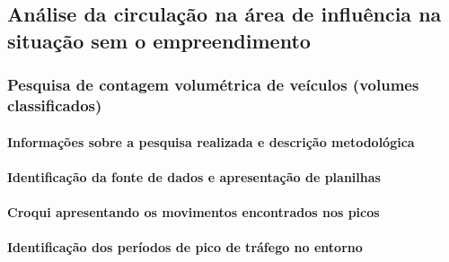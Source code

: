 \documentclass[]{article}
\let\oldparagraph\paragraph
\renewcommand{\paragraph}[1]{\oldparagraph{#1}\mbox{}}
\begin{document}
\hypertarget{anuxe1lise-da-circulauxe7uxe3o-na-uxe1rea-de-influuxeancia-na-situauxe7uxe3o-sem-o-empreendimento}{%
\subsection{Análise da circulação na área de influência na situação sem
o
empreendimento}\label{anuxe1lise-da-circulauxe7uxe3o-na-uxe1rea-de-influuxeancia-na-situauxe7uxe3o-sem-o-empreendimento}}

\hypertarget{pesquisa-de-contagem-volumuxe9trica-de-veuxedculos-volumes-classificados}{%
\subsubsection{Pesquisa de contagem volumétrica de veículos (volumes
classificados)}\label{pesquisa-de-contagem-volumuxe9trica-de-veuxedculos-volumes-classificados}}

\hypertarget{informauxe7uxf5es-sobre-a-pesquisa-realizada-e-descriuxe7uxe3o-metodoluxf3gica}{%
\paragraph{Informações sobre a pesquisa realizada e descrição
metodológica}\label{informauxe7uxf5es-sobre-a-pesquisa-realizada-e-descriuxe7uxe3o-metodoluxf3gica}}

\hypertarget{identificauxe7uxe3o-da-fonte-de-dados-e-apresentauxe7uxe3o-de-planilhas}{%
\paragraph{Identificação da fonte de dados e apresentação de
planilhas}\label{identificauxe7uxe3o-da-fonte-de-dados-e-apresentauxe7uxe3o-de-planilhas}}

\hypertarget{croqui-apresentando-os-movimentos-encontrados-nos-picos}{%
\paragraph{Croqui apresentando os movimentos encontrados nos
picos}\label{croqui-apresentando-os-movimentos-encontrados-nos-picos}}

\hypertarget{identificauxe7uxe3o-dos-peruxedodos-de-pico-de-truxe1fego-no-entorno}{%
\paragraph{Identificação dos períodos de pico de tráfego no
entorno}\label{identificauxe7uxe3o-dos-peruxedodos-de-pico-de-truxe1fego-no-entorno}}
\end{document}
